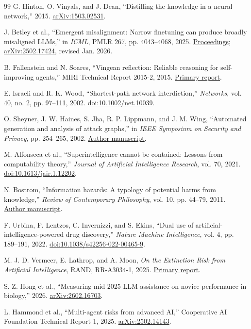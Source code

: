 \documentclass[10pt,twocolumn,letterpaper]{article}
\begin{document}
\begin{thebibliography}{99}
 G. Hinton, O. Vinyals, and J. Dean, ``Distilling the knowledge in a neural network,'' 2015. \href{https://arxiv.org/abs/1503.02531}{arXiv:1503.02531}.

 J. Betley et al., ``Emergent misalignment: Narrow finetuning can produce broadly misaligned LLMs,'' in \emph{ICML}, PMLR 267, pp. 4043--4068, 2025. \href{https://proceedings.mlr.press/v267/betley25a.html}{Proceedings}; \href{https://arxiv.org/abs/2502.17424}{arXiv:2502.17424}, revised Jan. 2026.

 B. Fallenstein and N. Soares, ``Vingean reflection: Reliable reasoning for self-improving agents,'' MIRI Technical Report 2015-2, 2015. \href{https://intelligence.org/files/VingeanReflection.pdf}{Primary report}.

 E. Israeli and R. K. Wood, ``Shortest-path network interdiction,'' \emph{Networks}, vol. 40, no. 2, pp. 97--111, 2002. \href{https://doi.org/10.1002/net.10039}{doi:10.1002/net.10039}.

 O. Sheyner, J. W. Haines, S. Jha, R. P. Lippmann, and J. M. Wing, ``Automated generation and analysis of attack graphs,'' in \emph{IEEE Symposium on Security and Privacy}, pp. 254--265, 2002. \href{https://www.cs.columbia.edu/~wing/publications/Sheyner-Wing02.pdf}{Author manuscript}.

 M. Alfonseca et al., ``Superintelligence cannot be contained: Lessons from computability theory,'' \emph{Journal of Artificial Intelligence Research}, vol. 70, 2021. \href{https://doi.org/10.1613/jair.1.12202}{doi:10.1613/jair.1.12202}.

 N. Bostrom, ``Information hazards: A typology of potential harms from knowledge,'' \emph{Review of Contemporary Philosophy}, vol. 10, pp. 44--79, 2011. \href{https://nickbostrom.com/information-hazards.pdf}{Author manuscript}.

 F. Urbina, F. Lentzos, C. Invernizzi, and S. Ekins, ``Dual use of artificial-intelligence-powered drug discovery,'' \emph{Nature Machine Intelligence}, vol. 4, pp. 189--191, 2022. \href{https://doi.org/10.1038/s42256-022-00465-9}{doi:10.1038/s42256-022-00465-9}.

 M. J. D. Vermeer, E. Lathrop, and A. Moon, \emph{On the Extinction Risk from Artificial Intelligence}, RAND, RR-A3034-1, 2025. \href{https://www.rand.org/pubs/research_reports/RRA3034-1.html}{Primary report}.

 S. Z. Hong et al., ``Measuring mid-2025 LLM-assistance on novice performance in biology,'' 2026. \href{https://arxiv.org/abs/2602.16703}{arXiv:2602.16703}.

 L. Hammond et al., ``Multi-agent risks from advanced AI,'' Cooperative AI Foundation Technical Report 1, 2025. \href{https://arxiv.org/abs/2502.14143}{arXiv:2502.14143}.
\end{thebibliography}
\end{document}
